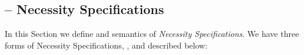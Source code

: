 




\subsection{\Chainmail -- Necessity Specifications}
\label{s:holistic-guarantees}

In this Section we define  and semantics of
\emph{Necessity Specifications}.
We have three forms of Necessity Specifications, , and described below:

